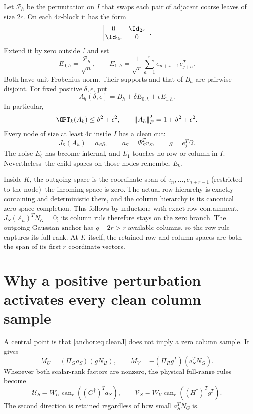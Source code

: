 \documentclass[11pt,oneside,openany,a4paper]{book}
\numberwithin{equation}{chapter}
\theoremstyle{definition}
\theoremstyle{remark}
\newcommand{\F}[1]{\left\lVert#1\right\rVert_F}
\begin{document}
Let $\mathcal P_h$ be the permutation on $I$ that swaps each pair of adjacent coarse leaves of size $2r$. On each $4r$-block it has the form
\[
 \begin{bmatrix}0&\Id_{2r}\\ \Id_{2r}&0\end{bmatrix}.
\]
Extend it by zero outside $I$ and set
\begin{equation}\label{anchor:eq:noises}
 E_{0,h}=\frac{\mathcal P_h}{\sqrt n},\qquad
 E_{1,h}=\frac1{\sqrt r}\sum_{a=1}^r e_{n+a-1}e_{j+a}^T.
\end{equation}
Both have unit Frobenius norm. Their supports and that of $B_h$ are pairwise disjoint. For fixed positive $\delta,\epsilon$, put
\begin{equation}\label{anchor:eq:A}
 A_h(\delta,\epsilon)=B_h+\delta E_{0,h}+\epsilon E_{1,h}.
\end{equation}
In particular,
\begin{equation}\label{anchor:eq:optupper}
 \OPT_k(A_h)\le\delta^2+\epsilon^2,\qquad
 \F{A_h}^2=1+\delta^2+\epsilon^2.
\end{equation}
Every node of size at least $4r$ inside $I$ has a clean cut:
\begin{equation}\label{anchor:eq:cleanJ}
 J_S(A_h)=a_Sg,\qquad a_S=\Psi_S^Tu_S,\qquad g=e_j^T\Omega.
\end{equation}
The noise $E_0$ has become internal, and $E_1$ touches no row or column in $I$. Nevertheless, the child spaces on those nodes remember $E_0$.

Inside $K$, the outgoing space is the coordinate span of $e_n,\ldots,e_{n+r-1}$ (restricted to the node); the incoming space is zero. The actual row hierarchy is exactly containing and deterministic there, and the column hierarchy is its canonical zero-space completion. This follows by induction: with exact row containment, $J_S(A_h)^TN_G=0$; its column rule therefore stays on the zero branch. The outgoing Gaussian anchor has $q-2r>r$ available columns, so the row rule captures its full rank. At $K$ itself, the retained row and column spaces are both the span of its first $r$ coordinate vectors.

\section{Why a positive perturbation activates every clean column sample}
A central point is that \eqref{anchor:eq:cleanJ} does not imply a zero column sample. It gives
\begin{equation}\label{anchor:eq:pure}
 M_U=(\Pi_Ga_S)(gN_H),\qquad
 M_V=-(\Pi_Hg^T)(a_S^TN_G).
\end{equation}
Whenever both scalar-rank factors are nonzero, the physical full-range rules become
\begin{equation}\label{anchor:eq:surrogate}
 \mathcal U_S=W_U\operatorname{can}_r((G^\dagger)^Ta_S),\qquad
 \mathcal V_S=W_V\operatorname{can}_r((H^\dagger)^Tg^T).
\end{equation}
The second direction is retained regardless of how small $a_S^TN_G$ is.
\end{document}
